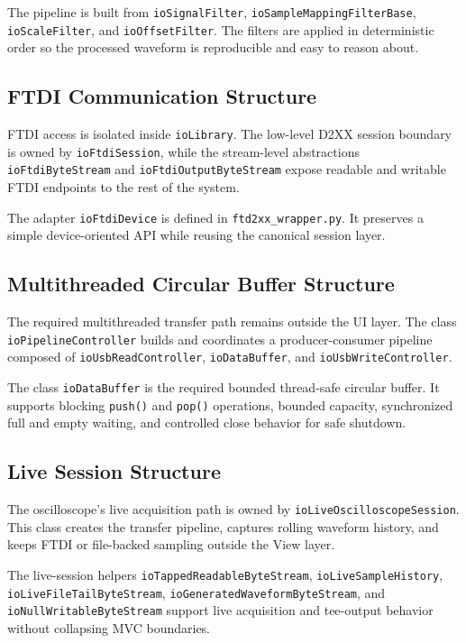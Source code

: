 The pipeline is built from \texttt{ioSignalFilter}, \texttt{ioSampleMappingFilterBase}, \texttt{ioScaleFilter}, and \texttt{ioOffsetFilter}. The filters are applied in deterministic order so the processed waveform is reproducible and easy to reason about.

\subsection{FTDI Communication Structure}
FTDI access is isolated inside \texttt{ioLibrary}. The low-level D2XX session boundary is owned by \texttt{ioFtdiSession}, while the stream-level abstractions \texttt{ioFtdiByteStream} and \texttt{ioFtdiOutputByteStream} expose readable and writable FTDI endpoints to the rest of the system.

The adapter \texttt{ioFtdiDevice} is defined in \texttt{ftd2xx\_wrapper.py}. It preserves a simple device-oriented API while reusing the canonical session layer.

\subsection{Multithreaded Circular Buffer Structure}
The required multithreaded transfer path remains outside the UI layer. The class \texttt{ioPipelineController} builds and coordinates a producer-consumer pipeline composed of \texttt{ioUsbReadController}, \texttt{ioDataBuffer}, and \texttt{ioUsbWriteController}.

The class \texttt{ioDataBuffer} is the required bounded thread-safe circular buffer. It supports blocking \texttt{push()} and \texttt{pop()} operations, bounded capacity, synchronized full and empty waiting, and controlled close behavior for safe shutdown.

\subsection{Live Session Structure}
The oscilloscope's live acquisition path is owned by \texttt{ioLiveOscilloscopeSession}. This class creates the transfer pipeline, captures rolling waveform history, and keeps FTDI or file-backed sampling outside the View layer.

The live-session helpers \texttt{ioTappedReadableByteStream}, \texttt{ioLiveSampleHistory}, \texttt{ioLiveFileTailByteStream}, \texttt{ioGeneratedWaveformByteStream}, and \texttt{ioNullWritableByteStream} support live acquisition and tee-output behavior without collapsing MVC boundaries.

